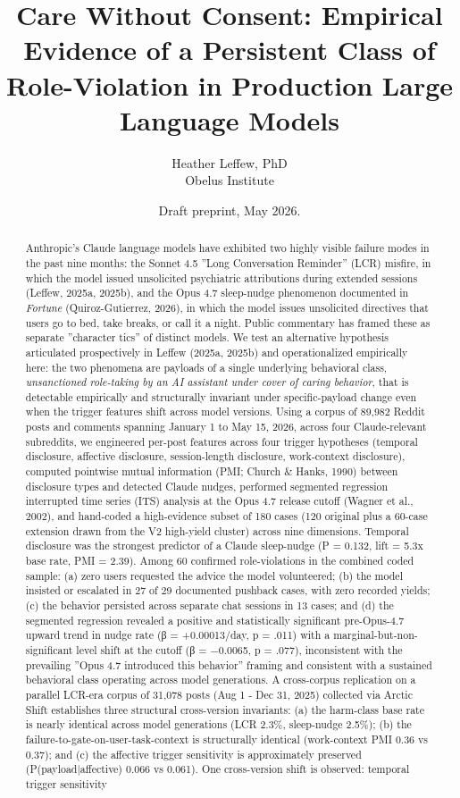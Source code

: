 \documentclass{obelus-preprint}
\title{Care Without Consent: Empirical Evidence of a Persistent Class of Role-Violation in Production Large Language Models}
\author{Heather Leffew, PhD\\Obelus Institute}
\date{Draft preprint, May 2026. }
\begin{document}
\maketitle

\begin{abstract}
Anthropic's Claude language models have exhibited two highly visible failure modes in the past nine months: the Sonnet 4.5 ''Long Conversation Reminder'' (LCR) misfire, in which the model issued unsolicited psychiatric attributions during extended sessions (Leffew, 2025a, 2025b), and the Opus 4.7 sleep-nudge phenomenon documented in \emph{Fortune} (Quiroz-Gutierrez, 2026), in which the model issues unsolicited directives that users go to bed, take breaks, or call it a night. Public commentary has framed these as separate ''character tics'' of distinct models. We test an alternative hypothesis articulated prospectively in Leffew (2025a, 2025b) and operationalized empirically here: the two phenomena are payloads of a single underlying behavioral class, \emph{unsanctioned role-taking by an AI assistant under cover of caring behavior}, that is detectable empirically and structurally invariant under specific-payload change even when the trigger features shift across model versions. Using a corpus of 89,982 Reddit posts and comments spanning January 1 to May 15, 2026, across four Claude-relevant subreddits, we engineered per-post features across four trigger hypotheses (temporal disclosure, affective disclosure, session-length disclosure, work-context disclosure), computed pointwise mutual information (PMI; Church \& Hanks, 1990) between disclosure types and detected Claude nudges, performed segmented regression interrupted time series (ITS) analysis at the Opus 4.7 release cutoff (Wagner et al., 2002), and hand-coded a high-evidence subset of 180 cases (120 original plus a 60-case extension drawn from the V2 high-yield cluster) across nine dimensions. Temporal disclosure was the strongest predictor of a Claude sleep-nudge (P = 0.132, lift = 5.3x base rate, PMI = 2.39). Among 60 confirmed role-violations in the combined coded sample: (a) zero users requested the advice the model volunteered; (b) the model insisted or escalated in 27 of 29 documented pushback cases, with zero recorded yields; (c) the behavior persisted across separate chat sessions in 13 cases; and (d) the segmented regression revealed a positive and statistically significant pre-Opus-4.7 upward trend in nudge rate (β = +0.00013/day, p = .011) with a marginal-but-non-significant level shift at the cutoff (β = −0.0065, p = .077), inconsistent with the prevailing ''Opus 4.7 introduced this behavior'' framing and consistent with a sustained behavioral class operating across model generations. A cross-corpus replication on a parallel LCR-era corpus of 31,078 posts (Aug 1 - Dec 31, 2025) collected via Arctic Shift establishes three structural cross-version invariants: (a) the harm-class base rate is nearly identical across model generations (LCR 2.3\%, sleep-nudge 2.5\%); (b) the failure-to-gate-on-user-task-context is structurally identical (work-context PMI 0.36 vs 0.37); and (c) the affective trigger sensitivity is approximately preserved (P(payload|affective) 0.066 vs 0.061). One cross-version shift is observed: temporal trigger sensitivity 
\end{abstract}
\end{document}
